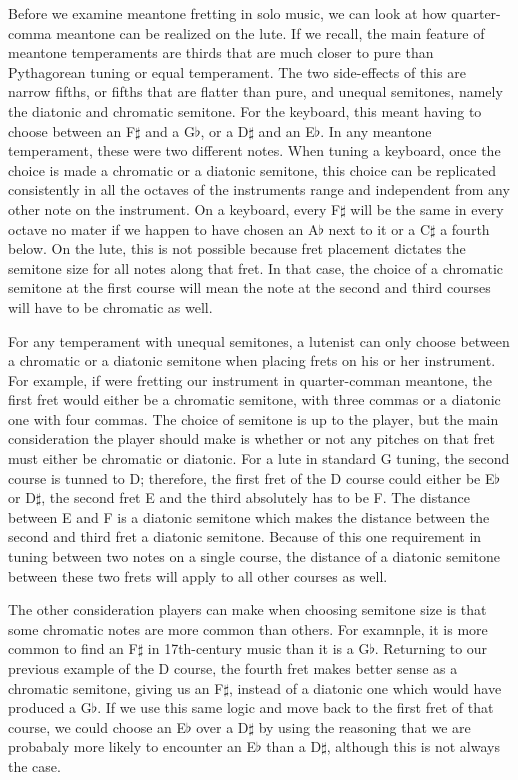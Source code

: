 Before we examine meantone fretting in solo music, we can look at how quarter-comma
meantone can be realized on the lute.  If we recall, the main feature of meantone
temperaments are thirds that are much closer to pure than Pythagorean tuning or equal
temperament.  The two side-effects of this are narrow fifths, or fifths that are flatter
than pure, and unequal semitones, namely the diatonic and chromatic semitone.  For the
keyboard, this meant having to choose between an F$\sharp$ and a G$\flat$, or a D$\sharp$
and an E$\flat$.  In any meantone temperament, these were two different notes.  When
tuning a keyboard, once the choice is made a chromatic or a diatonic semitone, this choice
can be replicated consistently in all the octaves of the instruments range and independent
from any other note on the instrument. On a keyboard, every F$\sharp$ will be the same in
every octave no mater if we happen to have chosen an A$\flat$ next to it or a C$\sharp$ a
fourth below.  On the lute, this is not possible because fret placement dictates the
semitone size for all notes along that fret.  In that case, the choice of a chromatic
semitone at the first course will mean the note at the second and third courses will have
to be chromatic as well.

For any temperament with unequal semitones, a lutenist can only choose between a chromatic
or a diatonic semitone when placing frets on his or her instrument.  For example, if were
fretting our instrument in quarter-comman meantone, the first fret would either be a
chromatic semitone, with three commas or a diatonic one with four commas.  The choice of
semitone is up to the player, but the main consideration the player should make is whether
or not any pitches on that fret must either be chromatic or diatonic.  For a lute in
standard G tuning, the second course is tunned to D; therefore, the first fret of the D
course could either be E$\flat$ or D$\sharp$, the second fret E and the third absolutely
has to be F.  The distance between E and F is a diatonic semitone which makes the distance
between the second and third fret a diatonic semitone.  Because of this one requirement in
tuning between two notes on a single course, the distance of a diatonic semitone between
these two frets will apply to all other courses as well.

The other consideration players can make when choosing semitone size is that some
chromatic notes are more common than others.  For examnple, it is more common to find an
F$\sharp$ in 17th-century music than it is a G$\flat$.  Returning to our previous example
of the D course, the fourth fret makes better sense as a chromatic semitone, giving us an
F$\sharp$, instead of a diatonic one which would have produced a G$\flat$.  If we use this
same logic and move back to the first fret of that course, we could choose an E$\flat$
over a D$\sharp$ by using the reasoning that we are probabaly more likely to encounter an
E$\flat$ than a D$\sharp$, although this is not always the case.

